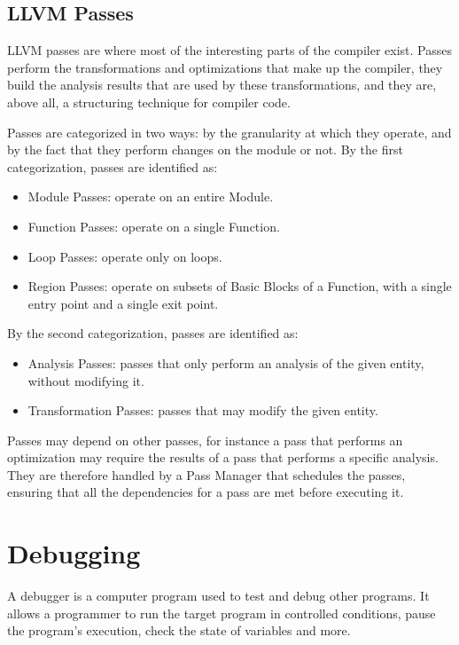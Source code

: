 \subsection{LLVM Passes\label{sec:llvm-passes}}
LLVM passes are where most of the interesting parts of the compiler exist. Passes perform the transformations and optimizations that make up the compiler, they build the analysis results that are used by these transformations, and they are, above all, a structuring technique for compiler code. \par
Passes are categorized in two ways: by the granularity at which they operate, and by the fact that they perform changes on the module or not. \newline
By the first categorization, passes are identified as:
\begin{itemize}
\item Module Passes: operate on an entire Module.
\item Function Passes: operate on a single Function.
\item Loop Passes: operate only on loops.
\item Region Passes: operate on subsets of Basic Blocks of a Function, with a single entry point and a single exit point.
\end{itemize}
By the second categorization, passes are identified as:
\begin{itemize}
\item Analysis Passes: passes that only perform an analysis of the given entity, without modifying it. 
\item Transformation Passes: passes that may modify the given entity.
\end{itemize} \par 
Passes may depend on other passes, for instance a pass that performs an optimization may require the results of a pass that performs a specific analysis.
They are therefore handled by a Pass Manager that schedules the passes, ensuring that all the dependencies for a pass are met before executing it. 

\section{Debugging}
A debugger is a computer program used to test and debug other programs. It allows a programmer to run the target program in controlled conditions, pause the program's execution, check the state of variables and more.

